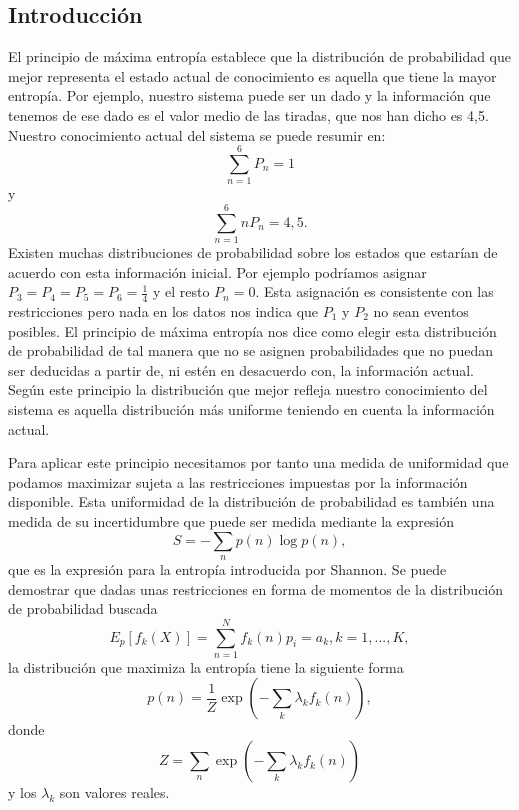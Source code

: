 \documentclass{article}
\theoremstyle{plain}
\theoremstyle{definition}
\begin{document}
	\subsection{Introducción}
	El principio de máxima entropía establece que la distribución de probabilidad que mejor representa el estado actual de conocimiento es aquella que tiene la mayor entropía. Por ejemplo, nuestro sistema puede ser un dado y la información que tenemos de ese dado es el valor medio de las tiradas, que nos han dicho es 4,5. Nuestro conocimiento actual del sistema se puede resumir en: \[\sum_{n=1}^{6}P_n=1 \] y \[\sum_{n=1}^{6}nP_n= 4,5 \text{.} \]
	Existen muchas distribuciones de probabilidad sobre los estados que estarían de acuerdo con esta información inicial. Por ejemplo podríamos asignar \(P_3=P_4=P_5=P_6= \frac{1}{4}\) y el resto \(P_n=0\). Esta asignación es consistente con las restricciones pero nada en los datos nos indica que \(P_1\) y \(P_2\) no sean eventos posibles. El principio de máxima entropía nos dice como elegir esta distribución de probabilidad de tal manera que no se asignen probabilidades que no puedan ser deducidas a partir de, ni estén en desacuerdo con, la información actual. Según este principio la distribución que mejor refleja nuestro conocimiento del sistema es aquella distribución más uniforme teniendo en cuenta la información actual. \par
	Para aplicar este principio necesitamos por tanto una medida de uniformidad que podamos maximizar sujeta a las restricciones impuestas por la información disponible. Esta uniformidad de la distribución de probabilidad es también una medida de su incertidumbre que puede ser medida mediante la expresión \[S = -\sum_{n}p(n)\log p(n),\] que es la expresión para la entropía introducida por Shannon. Se puede demostrar que dadas unas restricciones en forma de momentos de la distribución de probabilidad buscada \[E_p[f_k(X)]= \sum_{n=1}^Nf_k(n)p_i = a_k, k=1,\text{.}\text{.}\text{.},K ,\] la distribución que maximiza la entropía tiene la siguiente forma \[p(n) = \frac{1}{Z}\exp\left(-\sum_{k}\lambda_kf_k(n)\right),\] donde \[Z = \sum_{n}\exp\left(-\sum_{k}\lambda_kf_k(n)\right)\] y los \(\lambda_k\) son valores reales.
	
\end{document}
